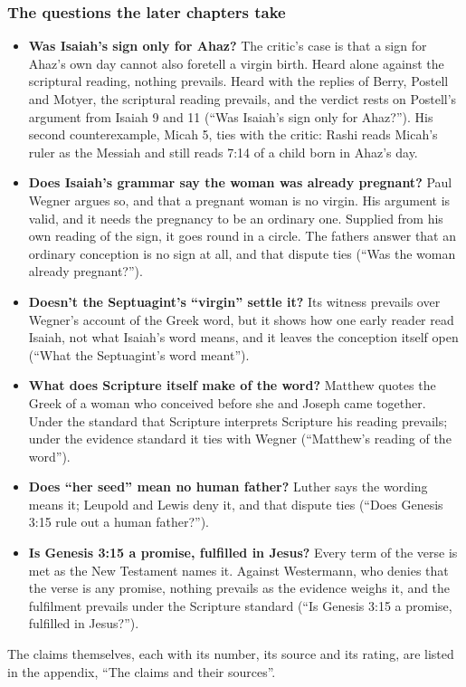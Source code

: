 \documentclass[11pt]{article}
\begin{document}
\subsubsection*{The questions the later chapters take}
\begin{itemize}
  \item \textbf{Was Isaiah’s sign only for Ahaz?} The critic’s case is that a sign for Ahaz’s own day cannot also foretell a virgin birth. Heard alone against the scriptural reading, nothing prevails. Heard with the replies of Berry, Postell and Motyer, the scriptural reading prevails, and the verdict rests on Postell’s argument from Isaiah 9 and 11 (“Was Isaiah’s sign only for Ahaz?”). His second counterexample, Micah 5, ties with the critic: Rashi reads Micah’s ruler as the Messiah and still reads 7:14 of a child born in Ahaz’s day.
  \item \textbf{Does Isaiah’s grammar say the woman was already pregnant?} Paul Wegner argues so, and that a pregnant woman is no virgin. His argument is valid, and it needs the pregnancy to be an ordinary one. Supplied from his own reading of the sign, it goes round in a circle. The fathers answer that an ordinary conception is no sign at all, and that dispute ties (“Was the woman already pregnant?”).
  \item \textbf{Doesn’t the Septuagint’s “virgin” settle it?} Its witness prevails over Wegner’s account of the Greek word, but it shows how one early reader read Isaiah, not what Isaiah’s word means, and it leaves the conception itself open (“What the Septuagint’s word meant”).
  \item \textbf{What does Scripture itself make of the word?} Matthew quotes the Greek of a woman who conceived before she and Joseph came together. Under the standard that Scripture interprets Scripture his reading prevails; under the evidence standard it ties with Wegner (“Matthew’s reading of the word”).
  \item \textbf{Does “her seed” mean no human father?} Luther says the wording means it; Leupold and Lewis deny it, and that dispute ties (“Does Genesis 3:15 rule out a human father?”).
  \item \textbf{Is Genesis 3:15 a promise, fulfilled in Jesus?} Every term of the verse is met as the New Testament names it. Against Westermann, who denies that the verse is any promise, nothing prevails as the evidence weighs it, and the fulfilment prevails under the Scripture standard (“Is Genesis 3:15 a promise, fulfilled in Jesus?”).
\end{itemize}
The claims themselves, each with its number, its source and its rating, are listed in the appendix, “The claims and their sources”.
\end{document}
